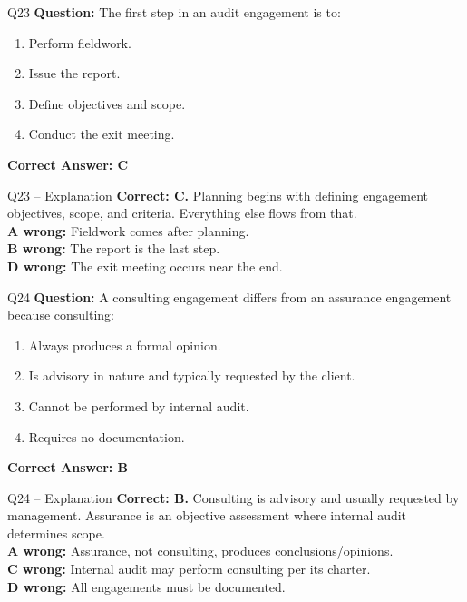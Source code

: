\documentclass[aspectratio=169,10pt]{beamer}
\begin{document}
	\begin{frame}[t]{Q23}
		\small
		\textbf{Question:} The first step in an audit engagement is to:
		\begin{enumerate}[label=\Alph*.,itemsep=1pt,topsep=2pt]
			\item Perform fieldwork.
			\item Issue the report.
			\item Define objectives and scope.
			\item Conduct the exit meeting.
		\end{enumerate}
		\vspace{4pt}
		\textbf{Correct Answer: C}
	\end{frame}
	
	\begin{frame}[t]{Q23 -- Explanation}
		\small
		\textbf{Correct: C.} Planning begins with defining engagement objectives, scope, and criteria. Everything else flows from that. \\[4pt]
		\textbf{A wrong:} Fieldwork comes after planning. \\[2pt]
		\textbf{B wrong:} The report is the last step. \\[2pt]
		\textbf{D wrong:} The exit meeting occurs near the end.
	\end{frame}
	
	\begin{frame}[t]{Q24}
		\small
		\textbf{Question:} A consulting engagement differs from an assurance engagement because consulting:
		\begin{enumerate}[label=\Alph*.,itemsep=1pt,topsep=2pt]
			\item Always produces a formal opinion.
			\item Is advisory in nature and typically requested by the client.
			\item Cannot be performed by internal audit.
			\item Requires no documentation.
		\end{enumerate}
		\vspace{4pt}
		\textbf{Correct Answer: B}
	\end{frame}
	
	\begin{frame}[t]{Q24 -- Explanation}
		\small
		\textbf{Correct: B.} Consulting is advisory and usually requested by management. Assurance is an objective assessment where internal audit determines scope. \\[4pt]
		\textbf{A wrong:} Assurance, not consulting, produces conclusions/opinions. \\[2pt]
		\textbf{C wrong:} Internal audit may perform consulting per its charter. \\[2pt]
		\textbf{D wrong:} All engagements must be documented.
	\end{frame}
	
\end{document}
